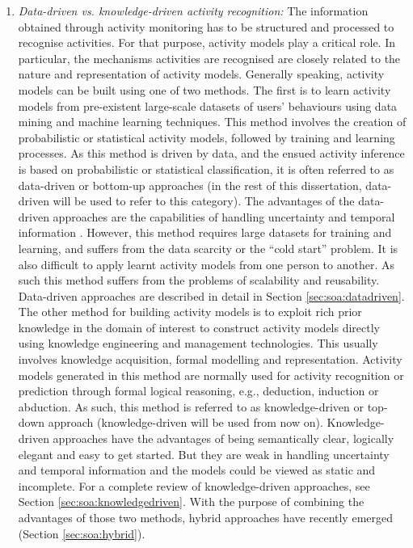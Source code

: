 \begin{enumerate}
 \item \textit{Data-driven vs. knowledge-driven activity recognition:} The information obtained through activity monitoring has to be structured and processed to recognise activities. For that purpose, activity models play a critical role. In particular, the mechanisms activities are recognised are closely related to the nature and representation of activity models. Generally speaking, activity models can be built using one of two methods. The first is to learn activity models from pre-existent large-scale datasets of users’ behaviours using data mining and machine learning techniques. This method involves the creation of probabilistic or statistical activity models, followed by training and learning processes. As this method is driven by data, and the ensued activity inference is based on probabilistic or statistical classification, it is often referred to as data-driven or bottom-up approaches (in the rest of this dissertation, data-driven will be used to refer to this category). The advantages of the data-driven approaches are the capabilities of handling uncertainty and temporal information \cite{Brand1997}. However, this method requires large datasets for training and learning, and suffers from the data scarcity or the “cold start” problem. It is also difficult to apply learnt activity models from one person to another. As such this method suffers from the problems of scalability and reusability. Data-driven approaches are described in detail in Section \ref{sec:soa:datadriven}. The other method for building activity models is to exploit rich prior knowledge in the domain of interest to construct activity models directly using knowledge engineering and management technologies. This usually involves knowledge acquisition, formal modelling and representation. Activity models generated in this method are normally used for activity recognition or prediction through formal logical reasoning, e.g., deduction, induction or abduction. As such, this method is referred to as knowledge-driven or top-down approach (knowledge-driven will be used from now on). Knowledge-driven approaches have the advantages of being semantically clear, logically elegant and easy to get started. But they are weak in handling uncertainty and temporal information and the models could be viewed as static and incomplete. For a complete review of knowledge-driven approaches, see Section \ref{sec:soa:knowledgedriven}. With the purpose of combining the advantages of those two methods, hybrid approaches have recently emerged (Section \ref{sec:soa:hybrid}). 
\end{enumerate}

